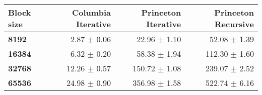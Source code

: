 \begin{tabular}{lrrr}\toprule
\textbf{Block size}  & \textbf{Columbia Iterative} & \textbf{Princeton Iterative} & \textbf{Princeton Recursive}\\\midrule
\textbf{8192}  & 2.87 $\pm$ 0.06 & 22.96 $\pm$ 1.10 & 52.08 $\pm$ 1.39\\
\textbf{16384}  & 6.32 $\pm$ 0.20 & 58.38 $\pm$ 1.94 & 112.30 $\pm$ 1.60\\
\textbf{32768}  & 12.26 $\pm$ 0.57 & 150.72 $\pm$ 1.08 & 239.07 $\pm$ 2.52\\
\textbf{65536} & 24.98 $\pm$ 0.90 & 356.98 $\pm$ 1.58 & 522.74 $\pm$ 6.16\\
\bottomrule
\end{tabular}
